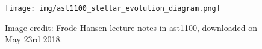 \begin{figure}
  \centering
  \texttt{[image: img/ast1100\_stellar\_evolution\_diagram.png]}
  \caption[Stellar evolution from main sequence to asymptotic giant branch]{ \label{img:ms-agb}
    Image credit: Frode Hansen \href{http://www.uio.no/studier/emner/matnat/astro/AST1100/h09/undervisningsmateriale/lecture20.pdf}{lecture notes in ast1100}, downloaded on May 23rd 2018.
  }
\end{figure}

